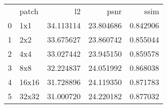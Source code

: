 \begin{tabular}{llrrr}
 & patch & l2 & psnr & ssim \\
0 & 1x1 & 34.113114 & 23.804686 & 0.842906 \\
1 & 2x2 & 33.675627 & 23.860742 & 0.855044 \\
2 & 4x4 & 33.027442 & 23.945150 & 0.859578 \\
3 & 8x8 & 32.224837 & 24.051992 & 0.868038 \\
4 & 16x16 & 31.728896 & 24.119350 & 0.871783 \\
5 & 32x32 & 31.000720 & 24.220182 & 0.877032 \\
\end{tabular}


